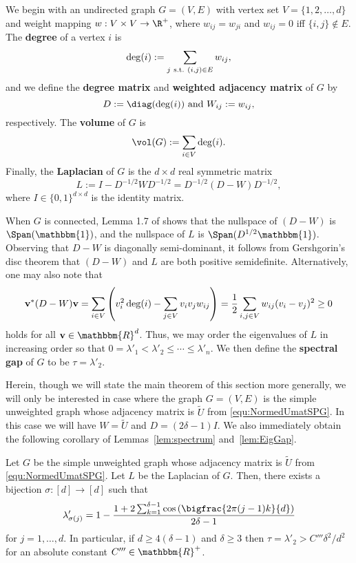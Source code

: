
We begin with an undirected graph $G = (V, E)$ with vertex set $V = \{1, 2, \dots, d\}$ and weight mapping $w: V \times V \to \R^+$, where $w_{ij} = w_{ji}$ and $w_{ij} = 0$ iff $\{i, j\} \notin E$.  The \textbf{degree} of a vertex $i$ is \[\deg(i) := \sum_{j ~{\rm s.t.}~ (i, j) \in E} w_{ij},\] and we define the \textbf{degree matrix} and \textbf{weighted adjacency matrix} of $G$ by \[D := \diag(\deg(i)) \ \text{and} \ W_{ij} := w_{ij},\] respectively.  The \textbf{volume} of $G$ is \[\vol(G) := \sum_{i \in V} \deg(i).\]  Finally, the \textbf{Laplacian} of $G$ is the $d \times d$ real symmetric matrix \[L := I - D^{-1/2} W D^{-1/2} = D^{-1/2}(D - W)D^{-1/2},\]
where $I \in \{ 0,1\}^{d \times d}$ is the identity matrix.  

When $G$ is connected, Lemma 1.7 of \cite{chungspectral} shows that the nullspace of $(D - W)$ is $\Span(\mathbbm{1})$, and the nullspace of $L$ is $\Span(D^{1/2}\mathbbm{1})$.  Observing that $D - W$ is diagonally semi-dominant, it follows from Gershgorin's disc theorem that $(D - W)$ and $L$ are both positive semidefinite.  Alternatively, one may also note that 
\[{\bf v}^*(D - W){\bf v} = \sum_{i \in V} \left(v_i^2\deg(i) - \sum_{j \in V} v_i v_j w_{ij}\right) = \frac{1}{2} \sum_{i, j \in V} w_{ij} (v_i - v_j)^2 \geq 0\]
holds for all ${\bf v} \in \mathbbm{R}^d$.  Thus, we may order the eigenvalues of $L$ in increasing order so that $0 = \lambda'_1 < \lambda'_2 \le \cdots \le \lambda'_n$.  
We then define the \textbf{spectral gap} of $G$ to be $\tau = \lambda'_2$.

Herein, though we will state the main theorem of this section more generally, we will only be interested in case where the graph $G=(V,E)$ is the simple unweighted graph whose adjacency matrix is $\tilde{U}$ from \eqref{equ:NormedUmatSPG}.  In this case we will have $W = \tilde{U}$ and $D = (2 \delta - 1)I$.  We also immediately obtain the following corollary of Lemmas~\ref{lem:spectrum} and~\ref{lem:EigGap}.

\begin{cor}
Let $G$ be the simple unweighted graph whose adjacency matrix is $\tilde{U}$ from \eqref{equ:NormedUmatSPG}.  Let $L$ be the Laplacian of $G$.  Then, there exists a bijection $\sigma:[d] \rightarrow [d]$ such that
$$\lambda'_{\sigma(j)} = 1 - \frac{1 + 2 \sum_{k = 1}^{\delta - 1}\cos\left(\bigfrac{2\pi (j-1) k}{d}\right)}{2 \delta - 1}$$
for $j = 1, \dots, d$.  In particular, if $d \geq 4(\delta - 1)$ and $\delta \geq 3$ then $\tau = \lambda'_2 > C'''\delta^2 / d^2$ for an absolute constant $C''' \in \mathbbm{R}^+$.
\label{cor:Gspectrum}
\end{cor}

